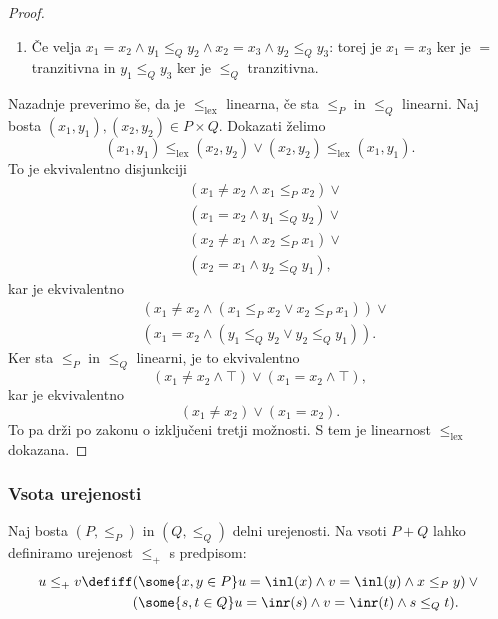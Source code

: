 \begin{proof}
\begin{enumerate}
  \item Če velja $x_1 = x_2 \land y_1 \leq_Q y_2 \land x_2 = x_3 \land y_2 \leq_Q y_3$: torej je $x_1 = x_3$ ker je $=$ tranzitivna in $y_1 \leq_Q y_3$ ker je $\leq_Q$ tranzitivna.
  \end{enumerate}
  Nazadnje preverimo še, da je $\leq_\mathrm{lex}$ linearna, če sta $\leq_P$ in $\leq_Q$ linearni. Naj bosta $(x_1,y_1), (x_2,y_2) \in P \times Q$. Dokazati želimo
  \begin{equation*}
    (x_1, y_1) \leq_\mathrm{lex} (x_2, y_2) \lor (x_2, y_2) \leq_\mathrm{lex} (x_1, y_1).
  \end{equation*}
  To je ekvivalentno disjunkciji
  \begin{align*}
    & (x_1 \neq x_2 \land x_1 \leq_P x_2) \lor {} \\
    & (x_1 = x_2 \land y_1 \leq_Q y_2) \lor {} \\
    & (x_2 \neq x_1 \land x_2 \leq_P x_1) \lor {} \\
    & (x_2 = x_1 \land y_2 \leq_Q y_1),
  \end{align*}
  kar je ekvivalentno
  \begin{align*}
    & (x_1 \neq x_2 \land (x_1 \leq_P x_2 \lor x_2 \leq_P x_1)) \lor {} \\
    &(x_1 = x_2 \land (y_1 \leq_Q y_2 \lor y_2 \leq_Q y_1)).
  \end{align*}
  Ker sta $\leq_P$ in $\leq_Q$ linearni, je to ekvivalentno
  \begin{equation*}
    (x_1 \neq x_2 \land \top) \lor (x_1 = x_2 \land \top),
  \end{equation*}
  kar je ekvivalentno
  \begin{equation*}
    (x_1 \neq x_2) \lor (x_1 = x_2).
  \end{equation*}
  To pa drži po zakonu o izključeni tretji možnosti. S tem je linearnost $\leq_\mathrm{lex}$ dokazana.
\end{proof}

\subsubsection{Vsota urejenosti}

Naj bosta $(P, \leq_P)$ in $(Q, \leq_Q)$ delni urejenosti. Na vsoti $P + Q$ lahko
definiramo urejenost $\leq_{+}$ s predpisom:
%
\begin{equation*}
  u \leq_{+} v \defiff
  \begin{aligned}[t]
    & (\some{x, y \in P} u = \inl(x) \land v = \inl(y) \land x \leq_P y) \lor {} \\
    & (\some{s, t \in Q} u = \inr(s) \land v = \inr(t) \land s \leq_Q t).
  \end{aligned}
\end{equation*}

